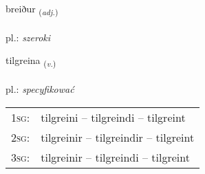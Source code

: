 \documentclass[frontgrid, backgrid]{flacards}\usepackage[]{graphicx}\usepackage[]{xcolor}
\begin{document}
{breiður \small{\textsubscript{(\textit{adj.})}} \\[1ex] %
\textphonetic{[preiːðʏr]} \\
pl.: \emph{szeroki} \\  [2ex]
\renewcommand*{\arraystretch}{0.8}
}

\renewcommand{\flhead}{\vskip5pt \fboxsep=0pt {\small\bfseries\footnotesize Sagnorð | Verb}}
\renewcommand{\fcfoot}{\vskip5pt \fboxsep=0pt \hspace{2pt}{\small\bfseries\footnotesize 2K}}

\renewcommand{\blhead}{\vskip5pt {\small\bfseries\footnotesize Sagnorð | Verb }}
\renewcommand{\bcfoot}{\vskip5pt \hspace{2pt}{\small\bfseries\footnotesize 2K}}


{tilgreina \small{\textsubscript{(\textit{v.})}} \\[1ex] %
\textphonetic{[tʰɪlkreina]} \\
pl.: \emph{specyfikować} \\  [2ex]
\renewcommand*{\arraystretch}{0.8}
\begin{tabular}{p{1cm}l}
\textsc{1sg}: & tilgreini -- tilgreindi -- tilgreint \\ 
\textsc{2sg}: & tilgreinir -- tilgreindir -- tilgreint \\ 
\textsc{3sg}: & tilgreinir -- tilgreindi -- tilgreint \\ 
\end{tabular}
}

\renewcommand{\flhead}{\vskip5pt \fboxsep=0pt {\small\bfseries\footnotesize Nafnorð | Noun}}
\renewcommand{\fcfoot}{\vskip5pt \fboxsep=0pt \hspace{2pt}{\small\bfseries\footnotesize 2K}}
\end{document}
